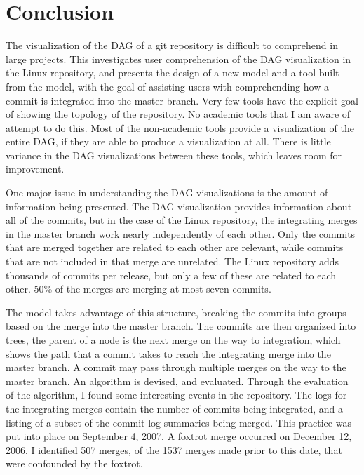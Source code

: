 \chapter{Conclusion}\label{chap:conclusion}

The visualization of the DAG of a git repository is difficult to
comprehend in large projects.
This \paper{} investigates user comprehension of the DAG
visualization in the Linux repository, and presents the design of a new
model and a tool built from the model, with the goal of assisting users
with comprehending how a commit is integrated into the master branch.
Very few tools have the explicit goal of showing the topology of the
repository. No academic tools that I am aware of attempt to do this.
Most of the non-academic tools provide a visualization of the entire
DAG, if they are able to produce a visualization at all. There is little
variance in the DAG visualizations between these tools, which leaves
room for improvement.

One major issue in understanding the DAG visualizations is the amount of
information being presented. The DAG visualization provides information
about all of the commits, but in the case of the Linux repository, the
integrating merges in the master branch work nearly independently of
each other. Only the commits that are merged together are related to
each other are relevant, while commits that are not included in that
merge are unrelated. The Linux repository adds thousands of commits per
release, but only a few of these are related to each other. 50\% of the
merges are merging at most seven commits.

The \mt{} model takes advantage of this structure, breaking the commits
into groups based on the merge into the master branch. The commits are
then organized into trees, the parent of a node is the next merge on the
way to integration, which shows the path that a commit takes to reach
the integrating merge into the master branch.  A commit may pass through
multiple merges on the way to the master branch. An algorithm is
devised, and evaluated. Through the evaluation of the algorithm, I found
some interesting events in the repository. The logs for the integrating
merges contain the number of commits being integrated, and a listing of
a subset of the commit log summaries being merged. This practice was put
into place on September 4, 2007. A foxtrot merge occurred on December
12, 2006. I identified 507 merges, of the 1537 merges made prior to this
date, that were confounded by the foxtrot.


